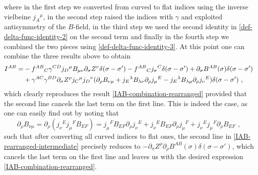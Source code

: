 \documentclass[12pt]{article}
\numberwithin{equation}{section}
\begin{document}
where in the first step we converted from curved to flat indices using the inverse vielbeine $j_{A}{}^{\mu}$, in the second step raised the indices with $\gamma$ and exploited antisymmetry of the $B$-field, in the third step we used the second identity in \eqref{def-delta-func-identity-2} on the second term and finally in the fourth step we combined the two pieces using \eqref{def-delta-func-identity-3}. At this point one can combine the three results above to obtain
\begin{align}\label{IAB-rearranged-intermediate}
I^{AB}=&-f^{AB}{}_{C}\gamma^{CD}j_{D}{}^{\mu}B_{\mu\nu}\partial_{\sigma}Z^{\nu}\delta(\sigma-\sigma')-f^{AB}{}_{C}j_{\sigma}{}^{C}\delta(\sigma-\sigma')+\partial_{\sigma}B^{AB}(\sigma)\delta(\sigma-\sigma')
\notag \\
&+\gamma^{AC}\gamma^{BD}\partial_{\sigma}Z^{\rho}j_{C}{}^{\mu}j_{D}{}^{\nu}(\partial_{\rho}B_{\nu\mu}+j_{E}{}^{\lambda}B_{\lambda\nu}\partial_{\rho}j_{\mu}{}^{E}-j_{E}{}^{\lambda}B_{\lambda\mu}\partial_{\rho}j_{\nu}{}^{E})\delta(\sigma-\sigma') \,\, ,
\end{align}
which clearly reproduces the result \eqref{IAB-combination-rearranged} provided that the second line cancels the last term on the first line. This is indeed the case, as one can easily find out by noting that
\begin{equation}
\partial_{\rho}B_{\nu\mu}=\partial_{\rho}(j_{\nu}{}^{E}j_{\mu}{}^{F}B_{EF})=j_{\mu}{}^{F}B_{EF}\partial_{\rho}j_{\nu}{}^{E}+j_{\nu}{}^{E}B_{EF}\partial_{\rho}j_{\mu}{}^{F}+j_{\nu}{}^{E}j_{\mu}{}^{F}\partial_{\rho}B_{EF} \,\, ,
\end{equation}
such that after converting all curved indices to flat ones, the second line in \eqref{IAB-rearranged-intermediate} precisely reduces to $-\partial_{\sigma}Z^{\rho}\partial_{\rho}B^{AB}(\sigma)\delta(\sigma-\sigma')$, which cancels the last term on the first line and leaves us with the desired expression \eqref{IAB-combination-rearranged}.
\end{document}
